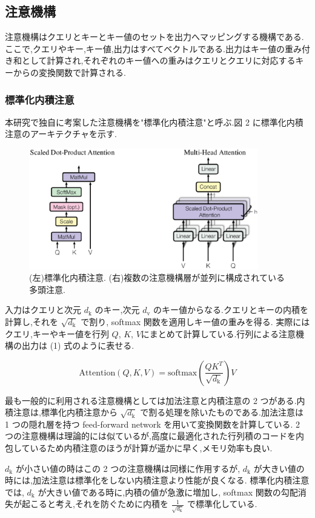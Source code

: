 \documentclass{jarticle}     %
\begin{document}
\subsection{注意機構}
注意機構はクエリとキーとキー値のセットを出力へマッピングする機構である.ここで,クエリやキー,キー値,出力はすべてベクトルである.出力はキー値の重み付き和として計算され,それぞれのキー値への重みはクエリとクエリに対応するキーからの変換関数で計算される.

\subsubsection{標準化内積注意}
本研究で独自に考案した注意機構を"標準化内積注意"と呼ぶ.図 2 に標準化内積注意のアーキテクチャを示す.\par

\begin{figure}[ht]
  \centering
  \includegraphics[width=100mm]{assets/Figure2.eps}

  \caption{(左)標準化内積注意. (右)複数の注意機構層が並列に構成されている多頭注意.}
  \label{Figure2}
\end{figure}


入力はクエリと次元 $d_\mathrm{k}$ のキー,次元 $d_\mathrm{v}$ のキー値からなる.クエリとキーの内積を計算し,それを $\sqrt{d_\mathrm{k}}$ で割り, softmax 関数を適用しキー値の重みを得る.
実際にはクエリ,キーやキー値を行列 $Q$, $K$, $V$にまとめて計算している.行列による注意機構の出力は (1) 式のように表せる.

\begin{equation}
  \mathrm{Attention}(Q,K,V) = \mathrm{softmax}(\frac{QK^T}{\sqrt{d_\mathrm{k}}})V
\end{equation}

\par

最も一般的に利用される注意機構としては加法注意と内積注意の 2 つがある\cite{2}.内積注意は,標準化内積注意から $\sqrt{d_\mathrm{k}}$ で割る処理を除いたものである.加法注意は 1 つの隠れ層を持つ feed-forward network を用いて変換関数を計算している. 2 つの注意機構は理論的には似ているが,高度に最適化された行列積のコードを内包しているため内積注意のほうが計算が遥かに早く,メモリ効率も良い.\par
$d_\mathrm{k}$ が小さい値の時はこの 2 つの注意機構は同様に作用するが, $d_\mathrm{k}$ が大きい値の時には,加法注意は標準化をしない内積注意より性能が良くなる\cite{3}. 標準化内積注意では, $d_\mathrm{k}$ が大きい値である時に,内積の値が急激に増加し, softmax 関数の勾配消失が起こると考え,それを防ぐために内積を $\frac{1}{\sqrt{d_\mathrm{k}}}$ で標準化している.
\end{document}
